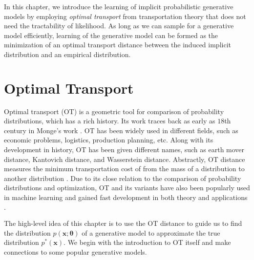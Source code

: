 In this chapter, we introduce the learning of implicit probabilistic generative models by employing \textit{optimal transport} from transportation theory that does not need the tractability of likelihood. As long as we can sample for a generative model efficiently, learning of the generative model can be formed as the minimization of an optimal transport distance between the induced implicit distribution and an empirical distribution.

\section{Optimal Transport}\label{chpt8:sec:ot}
Optimal transport (OT) is a geometric tool for comparison of probability distributions, which has a rich history. Its work traces back as early as $18$th century in Monge's work \cite{monge1781memoire}. OT has been widely used in different fields, such as economic problems, logistics, production planning, etc. Along with its development in history, OT has been given different names, such as earth mover distance, Kantovich distance, and Wasserstein distance. Abstractly, OT distance measures the minimum transportation cost of from the mass of a distribution to another distribution \cite{villani2003topics}. Due to its close relation to the comparison of probability distributions and optimization, OT and its
variants have also been popularly used in machine learning and gained fast development in both theory and applications \cite{2013arXiv1310.4375C, 2013arXiv1306.0895C, 2016arXiv161006519S, ClaiciCS18}.

The high-level idea of this chapter is to use the OT distance to guide us to find the distribution $p(\bm{x}; \bm{\theta})$ of a generative model to approximate the true distribution $p^{\ast}(\bm{x})$. We begin with the introduction to OT itself and make connections to some popular generative models.

